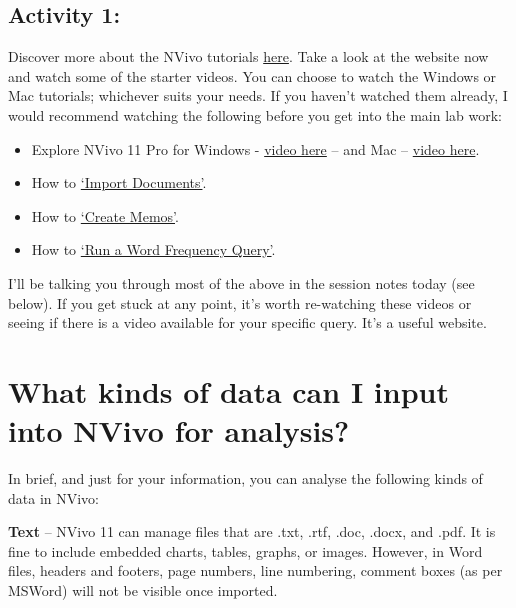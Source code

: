 \documentclass[]{book}
\providecommand{\tightlist}{%
  \setlength{\itemsep}{0pt}\setlength{\parskip}{0pt}}
\theoremstyle{definition}
\theoremstyle{definition}
\theoremstyle{definition}
\theoremstyle{remark}
\begin{document}
\hypertarget{activity-1}{%
\subsection{Activity 1:}\label{activity-1}}

Discover more about the NVivo tutorials
\href{https://www.qsrinternational.com/nvivo/free-nvivo-resources/tutorials}{here}.
Take a look at the website now and watch some of the starter videos. You
can choose to watch the Windows or Mac tutorials; whichever suits your
needs. If you haven't watched them already, I would recommend watching
the following before you get into the main lab work:

\begin{itemize}
\tightlist
\item
  Explore NVivo 11 Pro for Windows -
  \href{https://www.youtube.com/watch?v=S7Z8izUiQjA}{video here} -- and
  Mac -- \href{https://www.youtube.com/watch?v=ONUACL9UcWY}{video here}.
\item
  How to \href{https://www.youtube.com/watch?v=68OOsulWjGM}{`Import
  Documents'}.
\item
  How to \href{https://www.youtube.com/watch?v=6Mkgh2B25RM}{`Create
  Memos'}.
\item
  How to \href{https://www.youtube.com/watch?v=Pm2sgWuGvTI}{`Run a Word
  Frequency Query'}.
\end{itemize}

I'll be talking you through most of the above in the session notes today
(see below). If you get stuck at any point, it's worth re-watching these
videos or seeing if there is a video available for your specific query.
It's a useful website.

\hypertarget{what-kinds-of-data-can-i-input-into-nvivo-for-analysis}{%
\section{What kinds of data can I input into NVivo for
analysis?}\label{what-kinds-of-data-can-i-input-into-nvivo-for-analysis}}

In brief, and just for your information, you can analyse the following
kinds of data in NVivo:

\textbf{Text} -- NVivo 11 can manage files that are .txt, .rtf, .doc,
.docx, and .pdf. It is fine to include embedded charts, tables, graphs,
or images. However, in Word files, headers and footers, page numbers,
line numbering, comment boxes (as per MSWord) will not be visible once
imported.
\end{document}
